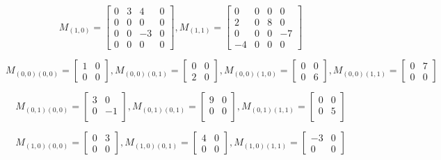 $$
M_{(1,0)}=
\left[
\begin{array}{cc|cc}
0 & 3 & 4  & 0 \\
0 & 0 & 0  & 0 \\
\hline
0 & 0 & -3 & 0 \\
0 & 0 & 0  & 0  
\end{array}
\right],
M_{(1,1)}=
\left[
\begin{array}{cc|cc}
 0  & 0 & 0 & 0 \\
 2  & 0 & 8 & 0 \\
 \hline
 0  & 0 & 0 & -7 \\
 -4 & 0 & 0 & 0 
\end{array}
\right]
$$

$$
M_{(0,0)(0,0)}=
\left[
\begin{array}{c|c}
1 & 0 \\
\hline
0 & 0 
\end{array}
\right],
M_{(0,0)(0,1)}=
\left[
\begin{array}{c|c}
0 & 0 \\
\hline
2 & 0 
\end{array}
\right],
M_{(0,0)(1,0)}=
\left[
\begin{array}{c|c}
0 & 0 \\
\hline
0 & 6 
\end{array}
\right],
M_{(0,0)(1,1)}=
\left[
\begin{array}{c|c}
0 & 7 \\
\hline
0 & 0 
\end{array}
\right]
$$

$$
M_{(0,1)(0,0)}=
\left[
\begin{array}{c|c}
3 & 0  \\
\hline
0 & -1 \\
\end{array}
\right],
M_{(0,1)(0,1)}=
\left[
\begin{array}{c|c}
9 & 0 \\
\hline
0 & 0 \\
\end{array}
\right],
M_{(0,1)(1,1)}=
\left[
\begin{array}{c|c}
0 & 0 \\
\hline
0 & 5 \\ 
\end{array}
\right]
$$

$$
M_{(1,0)(0,0)}=
\left[
\begin{array}{c|c}
0 & 3 \\
\hline
0 & 0 
\end{array}
\right],
M_{(1,0)(0,1)}=
\left[
\begin{array}{c|c}
4  & 0 \\
\hline
0  & 0 
\end{array}
\right],
M_{(1,0)(1,1)}=
\left[
\begin{array}{c|c}
 -3 & 0 \\
 \hline
 0  & 0  
\end{array}
\right]
$$

